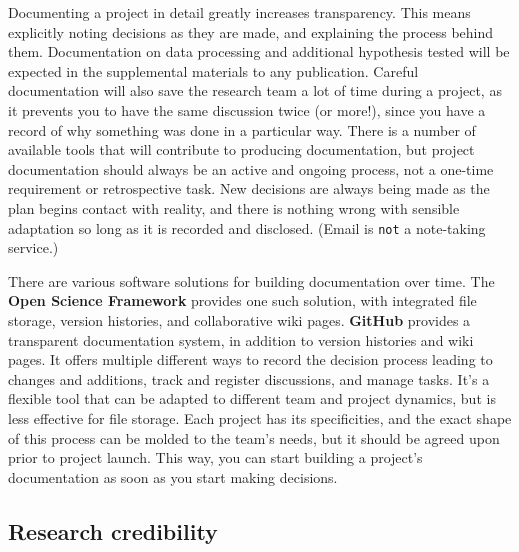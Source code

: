 Documenting a project in detail greatly increases transparency.
This means explicitly noting decisions as they are made, and explaining the process behind them.
Documentation on data processing and additional hypothesis tested will be expected in the supplemental materials to any publication.
Careful documentation will also save the research team a lot of time during a project,
as it prevents you to have the same discussion twice (or more!),
since you have a record of why something was done in a particular way.
There is a number of available tools
that will contribute to producing documentation,
but project documentation should always be an active and ongoing process,
not a one-time requirement or retrospective task.
New decisions are always being made as the plan begins contact with reality,
and there is nothing wrong with sensible adaptation so long as it is recorded and disclosed.
(Email is \texttt{not} a note-taking service.)

There are various software solutions for building documentation over time.
The \textbf{Open Science Framework} provides one such solution,
with integrated file storage, version histories, and collaborative wiki pages.
\textbf{GitHub} provides a transparent documentation system,
in addition to version histories and wiki pages.
It offers multiple different ways to record the decision process leading to changes and additions, 
track and register discussions, and manage tasks. 
It's a flexible tool that can be adapted to different team and project dynamics,
but is less effective for file storage.
Each project has its specificities,
and the exact shape of this process can be molded to the team's needs,
but it should be agreed upon prior to project launch.
This way, you can start building a project's documentation as soon as you start making decisions.

\subsection{Research credibility}

